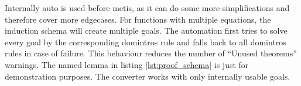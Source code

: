 Internally auto is used before metis, as it can do some more simplifications and therefore cover more edgecases.
For functions with multiple equations, the induction schema will create multiple goals.
The automation first tries to solve every goal by the corresponding domintros rule and falls back to all domintros rules in case of failure.
This behaviour reduces the number of ``Unused theorems'' warnings.
The named lemma in listing \ref{lst:proof_schema} is just for demonstration purposes.
The converter works with only internally usable goals.
